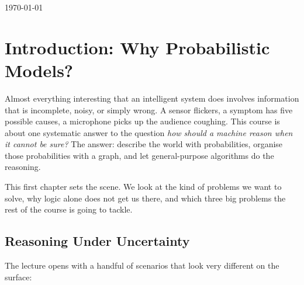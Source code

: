 \documentclass[11pt, oneside]{book}
\let\originalsection\section
\renewcommand{\section}{\Needspace{7\baselineskip}\originalsection}
\begin{document}
\vfill
{\centering\small\color{gray!65} \today\par}
\clearpage


\setcounter{tocdepth}{2}  %

\begingroup
  \let\cleardoublepage\relax
  \let\clearpage\relax
  \tableofcontents
\endgroup

\mainmatter  %




\chapter{Introduction: Why Probabilistic Models?}
\label{ch:intro}

Almost everything interesting that an intelligent system does involves
information that is incomplete, noisy, or simply wrong. A sensor flickers, a
symptom has five possible causes, a microphone picks up the audience coughing.
This course is about one systematic answer to the question \emph{how should a
machine reason when it cannot be sure?} The answer: describe the world with
probabilities, organise those probabilities with a graph, and let
general-purpose algorithms do the reasoning.

This first chapter sets the scene. We look at the kind of problems we want to
solve, why logic alone does not get us there, and which three big problems the
rest of the course is going to tackle.

\section{Reasoning Under Uncertainty}

The lecture opens with a handful of scenarios that look very different on the
surface:
\end{document}
